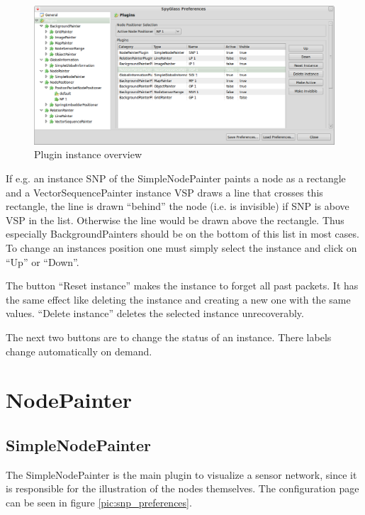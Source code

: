 \begin{figure}[htb]
  \begin{center}
    \includegraphics[width=13.2cm]{./pics/plugin_instances_overview}
    \caption{Plugin instance overview}
    \label{pic:plugin_instances_overview}
  \end{center}
\end{figure}

If e.g. an instance SNP of the SimpleNodePainter paints a node as a rectangle and a VectorSequencePainter instance VSP
draws a line that crosses this rectangle, the line is drawn ``behind'' the node (i.e. is invisible) if SNP
is above VSP in the list. Otherwise the line would be drawn above the rectangle. Thus especially BackgroundPainters
should be on the bottom of this list in most cases. To change an
instances position one must simply select the instance and click on ``Up'' or ``Down''.

The button ``Reset instance'' makes the instance to forget all past packets. It has the same effect like deleting the
instance and creating a new one with the same values. ``Delete instance'' deletes the selected instance unrecoverably.

The next two buttons are to change the status of an instance. There labels change automatically on demand.

\newpage
\section{NodePainter}

\subsection{SimpleNodePainter}

The SimpleNodePainter is the main plugin to visualize a sensor network, since it is responsible for the illustration
of the nodes themselves. The configuration page can be seen in figure \ref{pic:snp_preferences}.

